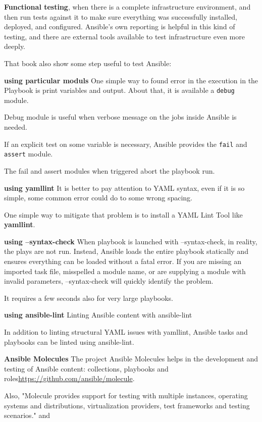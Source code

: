 \documentclass[12pt,a4paper,openright,twoside]{book}
\begin{document}
\textbf{Functional testing}, when there is a complete infrastructure environment, and then run tests against it to make sure everything was successfully installed, deployed, and configured. Ansible’s own reporting is helpful in this kind of testing, and there are external tools available to test infrastructure even more deeply.

That book also show some step useful to test Ansible:

\textbf{using particular moduls}
One simple way to found error in the execution in the Playbook is print variables and output. About that, it is available a \texttt{debug} module.


Debug module is useful when verbose message on the jobs inside Ansible is needed.


If an explicit test on some variable is necessary, Ansible provides the \texttt{fail} and \texttt{assert} module.


The fail and assert modules when triggered abort the playbook run.

\textbf{using yamllint}
It is better to pay attention to YAML syntax, even if it is so simple, some common error could do to some wrong spacing.


One simple way to mitigate that problem is to install a YAML Lint Tool like \textbf{yamllint}.

\textbf{using --syntax-check}
When playbook is launched with --syntax-check, in reality, the plays are not run. Instead, Ansible loads the entire playbook statically and ensures everything can be loaded without a fatal error. If you are missing an imported task file, misspelled a module name, or are supplying a module with invalid parameters, --syntax-check will quickly identify the problem.


It requires a few seconds also for very large playbooks.

\textbf{using ansible-lint}
Linting Ansible content with ansible-lint


In addition to linting structural YAML issues with yamllint, Ansible tasks and playbooks can be linted using ansible-lint.

\textbf{Ansible Molecules}
The project Ansible Molecules helps in the development and testing of Ansible content: collections, playbooks and roles\url{https://github.com/ansible/molecule}.


Also, "Molecule provides support for testing with multiple instances, operating systems and distributions, virtualization providers, test frameworks and testing scenarios." and 
\end{document}
